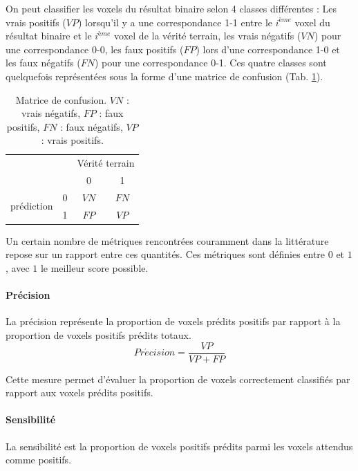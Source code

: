 On peut classifier les voxels du résultat binaire selon 4 classes différentes : Les vrais positifs ($VP$) lorsqu'il y a une correspondance 1-1 entre le $i^{ème}$ voxel du résultat binaire et le $i^{ème}$ voxel de la vérité terrain, les vrais négatifs ($VN$) pour une correspondance 0-0, les faux positifs ($FP$) lors d'une correspondance 1-0 et les faux négatifs ($FN$) pour une correspondance 0-1. Ces quatre classes sont quelquefois représentées sous la forme d'une matrice de confusion (Tab. \ref{tab:confusion_matrix}).

\begin{table}
  \caption{Matrice de confusion. $VN$ : vrais négatifs, $FP$ : faux positifs, $FN$ : faux négatifs, $VP$ : vrais positifs.}
  \label{tab:confusion_matrix}
  \centering
  \begin{tabular}{ cccc }
    \hline
                                      &   &\multicolumn{2}{c}{Vérité terrain} \\
                                      &   & 0  & 1 \\
      \multirow{2}{*}{prédiction}     & 0 & $VN$ & $FN$ \\
                                      & 1 & $FP$ & $VP$  \\
    \hline
  \end{tabular}
\end{table}

Un certain nombre de métriques rencontrées couramment dans la littérature repose sur un rapport entre ces quantités. Ces métriques sont définies entre $0$ et $1$, avec $1$ le meilleur score possible. 

\paragraph{Précision}
La précision représente la proportion de voxels prédits positifs par rapport à la proportion de voxels positifs prédits totaux.
\begin{equation}
  Pr\acute{e}cision = \frac{VP}{VP+FP}
\end{equation}

Cette mesure permet d'évaluer la proportion de voxels correctement classifiés par rapport aux voxels prédits positifs.

\paragraph{Sensibilité}

La sensibilité est la proportion de voxels positifs prédits parmi les voxels attendus comme positifs.

